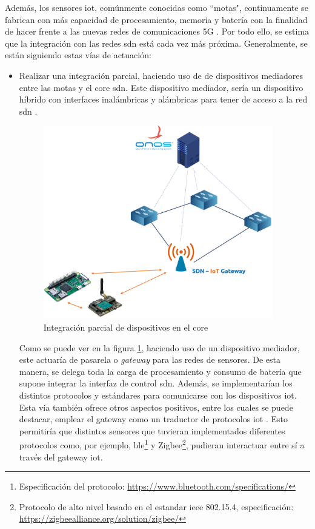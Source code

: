 Además, los sensores \gls{iot}, comúnmente conocidas como ``motas", continuamente se fabrican con más capacidad de procesamiento, memoria y batería con la finalidad de hacer frente a las nuevas redes de comunicaciones 5G \cite{capra2019edge}. Por todo ello,  se estima que la integración con las redes \gls{sdn} está cada vez más próxima. Generalmente, se están siguiendo estas vías de actuación:
\begin{itemize}
    \item \label{iot_integracionParcial}Realizar una integración parcial, haciendo uso de de dispositivos mediadores entre las motas y el core \gls{sdn}. Este dispositivo mediador, sería un dispositivo híbrido con interfaces inalámbricas y alámbricas para tener de acceso a la red \gls{sdn} \cite{7848825}. 
    
     \begin{figure}[h]
        \centering
        \includegraphics[width=10cm]{archivos/img/intro/sdn_iot.png}
        \caption{Integración parcial de dispositivos  en el core }
        \label{sdn_iot_parcial}
    \end{figure}
    Como se puede ver en la figura \ref{sdn_iot_parcial}, haciendo uso de un dispositivo mediador, este actuaría de pasarela o \textit{gateway} para las redes de sensores. De esta manera, se delega toda la carga de procesamiento y consumo de batería que supone integrar la interfaz de control \gls{sdn}. Además, se implementarían los distintos protocolos y estándares para comunicarse con los dispositivos \gls{iot}. Esta vía también ofrece otros aspectos positivos, entre los cuales se puede destacar, emplear el gateway como un traductor de protocolos \gls{iot} \cite{8470257}. Esto permitiría que distintos sensores que tuvieran implementados diferentes protocolos como, por ejemplo, \gls{ble}\footnote{Especificación del protocolo:  \url{https://www.bluetooth.com/specifications/}} y Zigbee\footnote{Protocolo de alto nivel basado en el estandar \gls{ieee} 802.15.4, especificación: \url{https://zigbeealliance.org/solution/zigbee/} }, pudieran interactuar entre sí a través del  gateway \gls{iot}.
    

\end{itemize}
